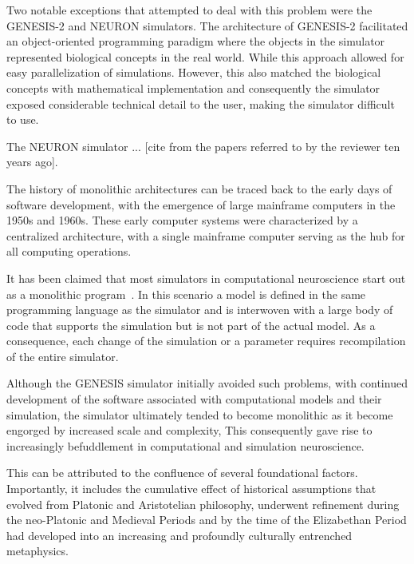 \documentclass[11pt,3p,twocolumn]{JMN}
\begin{document}
Two notable exceptions that attempted to deal with this problem were the GENESIS-2 and NEURON simulators.  The architecture of GENESIS-2 facilitated an object-oriented programming paradigm where the objects in the simulator represented biological concepts in the real world.  While this approach allowed for easy parallelization of simulations. However, this also matched the biological concepts with mathematical implementation and consequently the simulator exposed considerable technical detail to the user, making the simulator difficult to use.

The NEURON simulator ... [cite from the papers referred to by the reviewer ten years ago].

The history of monolithic architectures can be traced back to the early days of software development, with the emergence of large mainframe computers in the 1950s and 1960s. These early computer systems were characterized by a centralized architecture, with a single mainframe computer serving as the hub for all computing operations.

It has been claimed that most simulators in computational neuroscience start out as a monolithic program~\citep{cannon07:_inter}. In this scenario a model is defined in the same programming language as the simulator and is interwoven with a large body of code that supports the simulation but is not part of the actual model. As a consequence, each change of the simulation or a parameter requires recompilation of the entire simulator.

Although the GENESIS simulator initially avoided such problems, with continued development of the software associated with computational models and their simulation, the simulator ultimately tended to become monolithic as it become engorged by increased scale and complexity, This consequently gave rise to increasingly befuddlement in computational and simulation neuroscience.

This can be attributed to the confluence of several foundational factors. Importantly, it includes the cumulative effect of historical assumptions that evolved from Platonic and Aristotelian philosophy, underwent refinement during the neo-Platonic and Medieval Periods and by the time of the Elizabethan Period had developed into an increasing and profoundly culturally entrenched metaphysics.
\end{document}
